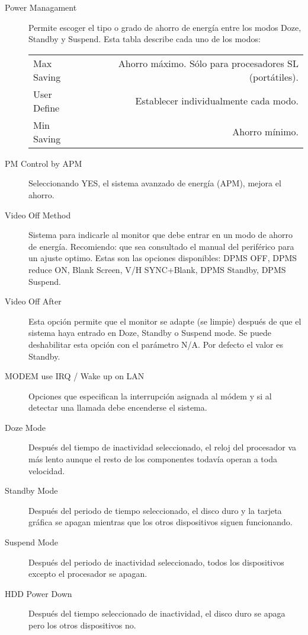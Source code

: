 			\begin{description}
				\item[Power Managament] Permite escoger el tipo o grado de
					ahorro de energía entre los modos Doze, Standby y Suspend.
					Esta tabla describe cada uno de los modos:

					\begin{tabular}{| l | r |}
						\hline
		 Max Saving  & Ahorro máximo. Sólo para procesadores SL (portátiles). \\ 
		 User Define & Establecer individualmente cada modo. \\ 
		 Min Saving  & Ahorro mínimo. \\ 
						\hline
					\end{tabular}
				\item[PM Control by APM] Seleccionando YES, el sistema avanzado
					de energía (APM), mejora el ahorro.
				\item[Video Off Method] Sistema para indicarle al monitor que
					debe entrar en un modo de ahorro de energía. Recomiendo:
					que sea consultado el manual del periférico para un ajuste
					optimo.  Estas son las opciones disponibles: DPMS OFF, DPMS
					reduce ON, Blank Screen, V/H SYNC+Blank, DPMS Standby, DPMS
					Suspend.
				\item[Video Off After] Esta opción permite que el monitor se
					adapte (se limpie) después de que el sistema haya entrado
					en Doze, Standby o Suspend mode. Se puede deshabilitar esta
					opción con el parámetro N/A. Por defecto el valor es
					Standby.
				\item[MODEM use IRQ / Wake up on LAN] Opciones que especifican
					la interrupción asignada al módem y si al detectar una
					llamada debe encenderse el sistema.
				\item[Doze Mode] Después del tiempo de inactividad
					seleccionado, el reloj del procesador va más lento aunque
					el resto de los componentes todavía operan a toda
					velocidad.
				\item[Standby Mode] Después del periodo de tiempo seleccionado,
					el disco duro y la tarjeta gráfica se apagan mientras que
					los otros dispositivos siguen funcionando.
				\item[Suspend Mode] Después del periodo de inactividad
					seleccionado, todos los dispositivos excepto el procesador
					se apagan.
				\item[HDD Power Down] Después del tiempo seleccionado de
					inactividad, el disco duro se apaga pero los otros
					dispositivos no.

\end{description}
